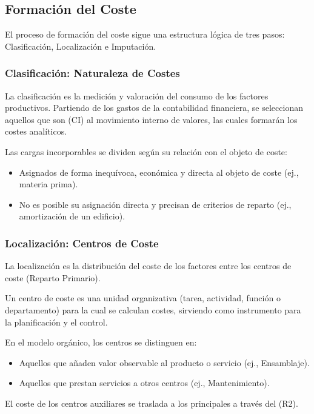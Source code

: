 \subsection{Formación del Coste}

El proceso de formación del coste sigue una estructura lógica de tres pasos: Clasificación, Localización e Imputación.

\subsubsection{Clasificación: Naturaleza de Costes}

La clasificación es la medición y valoración del consumo de los factores productivos. Partiendo de los gastos de la contabilidad financiera, se seleccionan aquellos que son  (CI) al movimiento interno de valores, las cuales formarán los costes analíticos.

Las cargas incorporables se dividen según su relación con el objeto de coste:
\begin{itemize}
    \item {} Asignados de forma inequívoca, económica y directa al objeto de coste (ej., materia prima).
    \item {} No es posible su asignación directa y precisan de criterios de reparto (ej., amortización de un edificio).
\end{itemize}

\subsubsection{Localización: Centros de Coste}

La localización es la distribución del coste de los factores entre los centros de coste (Reparto Primario).

Un centro de coste es una unidad organizativa (tarea, actividad, función o departamento) para la cual se calculan costes, sirviendo como instrumento para la planificación y el control.

En el modelo orgánico, los centros se distinguen en:
\begin{itemize}
    \item {} Aquellos que añaden valor observable al producto o servicio (ej., Ensamblaje).
    \item {} Aquellos que prestan servicios a otros centros (ej., Mantenimiento).
\end{itemize}
El coste de los centros auxiliares se traslada a los principales a través del  (R2).

